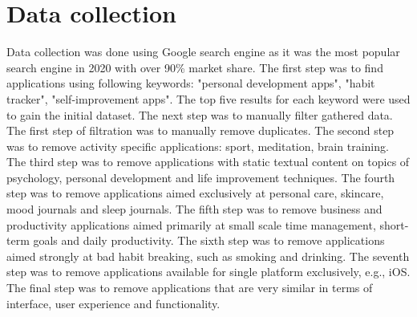 
\section{Data collection}\label{sec:data-collection}

Data collection was done using Google search engine as it was the most popular search engine in 2020 with over 90\% market share.\cite{google-market-share}
The first step was to find applications using following keywords: "personal development apps", "habit tracker", "self-improvement apps".
The top five results for each keyword were used to gain the initial dataset.
The next step was to manually filter gathered data.
The first step of filtration was to manually remove duplicates.
The second step was to remove activity specific applications: sport, meditation, brain training.
The third step was to remove applications with static textual content on topics of psychology, personal development and life improvement techniques.
The fourth step was to remove applications aimed exclusively at personal care, skincare, mood journals and sleep journals.
The fifth step was to remove business and productivity applications aimed primarily at small scale time management, short-term goals and daily productivity.
The sixth step was to remove applications aimed strongly at bad habit breaking, such as smoking and drinking.
The seventh step was to remove applications available for single platform exclusively, e.g., iOS\@.
The final step was to remove applications that are very similar in terms of interface, user experience and functionality.

